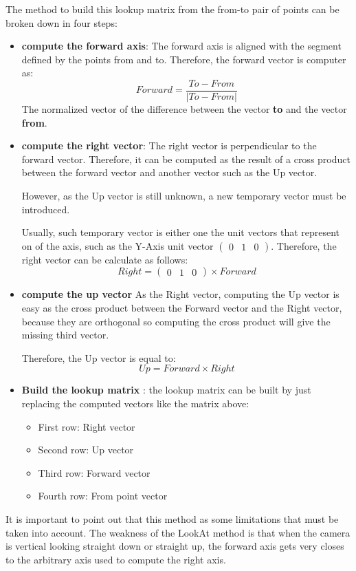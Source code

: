 \documentclass[12pt,a4paper]{extarticle}
\begin{document}
The method to build this lookup matrix from the from-to pair of points can be broken down in four steps:
\begin{itemize}
\item \textbf{compute the forward axis}: The forward axis is aligned with the segment defined by the points from and to. Therefore, the forward vector is computer as: 
\[
Forward = \frac{To - From}{|To-From|}
\] 
The normalized vector of the difference between the vector \textbf{to} and the vector \textbf{from}.
\item \textbf{compute the right vector}: The right vector is perpendicular to the forward vector. Therefore, it can be computed as the result of a cross product between the forward vector and another vector such as the Up vector. 

However, as the Up vector is still unknown, a new temporary vector must be introduced. 

Usually, such temporary vector is either one the unit vectors that represent on of the axis, such as the Y-Axis unit vector $\begin{pmatrix}
0 & 1 &0
\end{pmatrix}$. Therefore, the right vector can be calculate as follows:
\[
Right = \begin{pmatrix}
0 & 1 & 0
\end{pmatrix}
\times Forward
\]
\item \textbf{compute the up vector} As the Right vector, computing the Up vector is easy as the cross product between the Forward vector and the Right vector, because they are orthogonal so computing the cross product will give the missing third vector.

Therefore, the Up vector is equal to:
\[
Up = Forward \times Right
\]
\item \textbf{Build the lookup matrix} : the lookup matrix can be built by just replacing the computed vectors like the matrix above:
\begin{itemize}
\item First row: Right vector
\item Second row: Up vector
\item Third row: Forward vector
\item Fourth row: From point vector
\end{itemize}
\end{itemize}

It is important to point out that this method as some limitations that must be taken into account. The weakness of the LookAt method is that when the camera is vertical looking straight down or straight up, the forward axis gets very closes to the arbitrary axis used to compute the right axis. 
\end{document}
